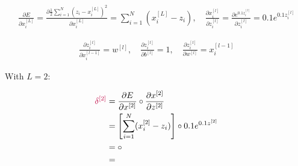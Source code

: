 \documentclass[12pt]{article}
\begin{document}
\begin{enumerate}[leftmargin=\labelsep]
\begin{enumerate}

                \begin{equation*}
                  \begin{aligned}
                    \frac{\partial E}{\partial x_i^{[L]}} = \frac{\partial \frac{1}{2}\sum_{i=1}^N (z_i - x_i^{[L]})^2}{\partial x_i^{[L]}} = \sum_{i=1}^N (x_i^{[L]} - z_i), \quad
                    \frac{\partial x_i^{[l]}}{\partial z_i^{[l]}} = \frac{\partial e^{0.1z_i^{[l]}}}{\partial z_i^{[l]}} = 0.1e^{0.1z_i^{[l]}}
                  \end{aligned}
                \end{equation*}

                \begin{equation*}
                  \begin{aligned}
                    \frac{\partial z_i^{[l]}}{\partial x_i^{[l - 1]}} = w^{[l]}, \quad
                    \frac{\partial z_i^{[l]}}{\partial b^{[l]}} = 1, \quad
                    \frac{\partial z_i^{[l]}}{\partial w^{[l]}} = x_i^{[l - 1]}
                  \end{aligned}
                \end{equation*}

                With $L = 2$:

                \begin{equation*}
                  \begin{aligned}
                    \textcolor{purple}{\delta^{[2]}} & = \frac{\partial E}{\partial x^{[2]}} \circ \frac{\partial x^{[2]}}{\partial z^{[2]}} \\
                                                     & = \left[\sum_{i=1}^N(x_i^{[2]} - z_i)\right] \circ 0.1e^{0.1z^{[2]}}                  \\
                                                     & =  \circ        \\
                                                     & = 
                  \end{aligned}
                \end{equation*}

                \pagebreak


\end{enumerate}
\end{enumerate}
\end{document}
